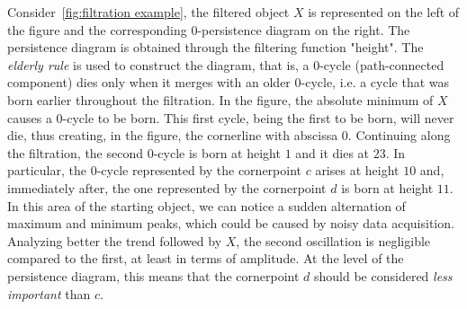 \documentclass[english, LaM, oneside, noexaminfo]{sapthesis}
\begin{document}
Consider~\cref{fig:filtration example}, the filtered object $X$ is represented on the left of the figure and the corresponding $0$-persistence diagram on the right. The persistence diagram is obtained through the filtering function "height". The \textit{elderly rule} is used to construct the diagram, that is, a $0$-cycle (path-connected component) dies only
when it merges with an older $0$-cycle, i.e. a cycle that was born earlier throughout the filtration. In the figure, the absolute minimum of $X$ causes a $0$-cycle to be born. This first cycle, being the first to be born, will never die, thus creating, in the figure, the cornerline with abscissa $0$. Continuing along the filtration, the second $0$-cycle is born at height $1$ and it dies at $23$. 
In particular, the $0$-cycle represented by the cornerpoint $c$ arises at height $10$ and, immediately after, the one represented by the cornerpoint $d$ is born at height $11$.
In this area of the starting object, we can notice a sudden alternation of maximum and minimum peaks, which could be caused by noisy data acquisition. Analyzing better the trend followed by $X$, the second oscillation is negligible compared to the first, at least in terms of amplitude.
At the level of the persistence diagram, this means that the cornerpoint $d$ should be considered \textit{less important} than $c$.


\end{document}
